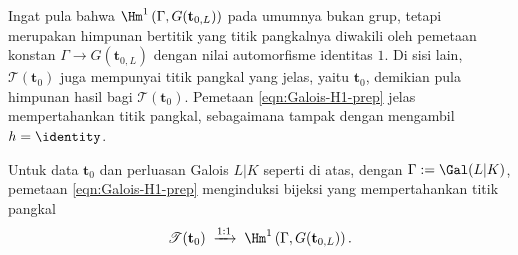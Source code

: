 Ingat pula bahwa
$\Hm^1\left(\Gamma,G(\mathbf{t}_{0,L})\right)$ pada umumnya bukan grup,
tetapi merupakan himpunan bertitik yang titik pangkalnya diwakili oleh
pemetaan konstan $\Gamma\to G(\mathbf{t}_{0,L})$ dengan nilai automorfisme
identitas $1$. Di sisi lain, $\mathcal{T}(\mathbf{t}_0)$ juga mempunyai titik
pangkal yang jelas, yaitu $\mathbf{t}_0$, demikian pula himpunan hasil bagi
$\mathscr{T}(\mathbf{t}_0)$. Pemetaan \eqref{eqn:Galois-H1-prep} jelas
mempertahankan titik pangkal, sebagaimana tampak dengan mengambil
$h=\identity$.

\begin{theorem}\label{prop:Galois-H1}
	Untuk data $\mathbf{t}_0$ dan perluasan Galois $L|K$ seperti di atas,
	dengan $\Gamma:=\Gal(L|K)$, pemetaan \eqref{eqn:Galois-H1-prep}
	menginduksi bijeksi yang mempertahankan titik pangkal
	\[
	\mathscr{T}(\mathbf{t}_0)\;\xrightarrow{1:1}\;
	\Hm^1\left(\Gamma,G(\mathbf{t}_{0,L})\right).
	\]
\end{theorem}
